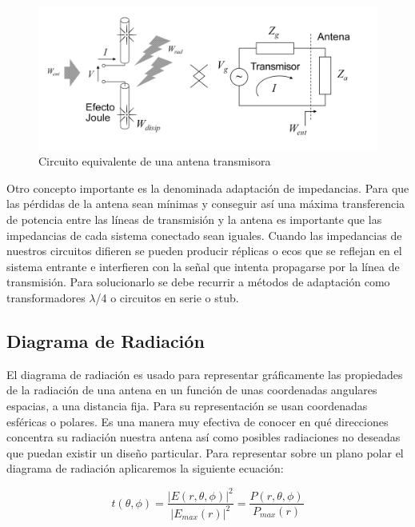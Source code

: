 \begin{figure}[h]
    \centering
        \includegraphics[width=15cm]{archivos/impedancia}
        \caption{Circuito equivalente de una antena transmisora}
        \label{fig:impedancia}
\end{figure}
\par Otro concepto importante es la denominada adaptación de impedancias. Para que las pérdidas de la antena sean mínimas y conseguir así una máxima transferencia de potencia entre las líneas de transmisión y la antena es importante que las impedancias de cada sistema conectado sean iguales. Cuando las impedancias de nuestros circuitos difieren se pueden producir réplicas o ecos que se reflejan en el sistema entrante e interfieren con la señal que intenta propagarse por la línea de transmisión. Para solucionarlo se debe recurrir a métodos de adaptación como transformadores $\lambda$/4 o circuitos en serie o stub.

\subsection{Diagrama de Radiación}

\par El diagrama de radiación es usado para representar gráficamente las propiedades de la radiación de una antena en un función de unas coordenadas angulares espacias, a una distancia fija. Para su representación se usan coordenadas esféricas o polares. Es una manera muy efectiva de conocer en qué direcciones concentra su radiación nuestra antena así como posibles radiaciones no deseadas que puedan existir un diseño particular. Para representar sobre un plano polar el diagrama de radiación aplicaremos la siguiente ecuación:

\begin{equation}
	t(\theta, \phi )=\frac{\left | E(r, \theta, \phi ) \right |^2}{\left | E_{max}(r) \right |^2}= \frac{P(r,\theta ,\phi)}{P_{max}(r)}
	\label{eq:diagramarad}
\end{equation}

